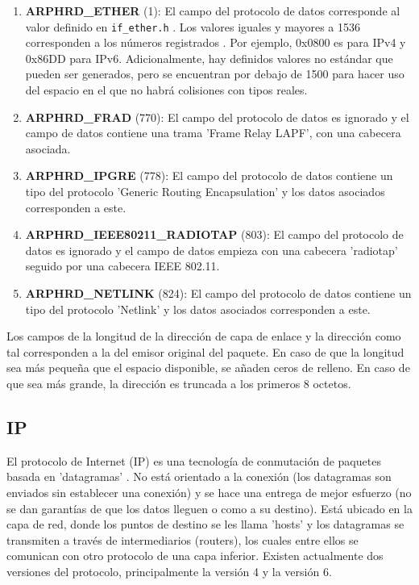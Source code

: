 \begin{enumerate}
    \item \textbf{ARPHRD\_ETHER} (1): El campo del protocolo de datos corresponde al valor definido en \texttt{if\_ether.h} \cite{linuxifether}. Los valores iguales y mayores a 1536 corresponden a los números registrados \cite{etherprotocolnumbers}. Por ejemplo, 0x0800 es para IPv4 y 0x86DD para IPv6. Adicionalmente, hay definidos valores no estándar que pueden ser generados, pero se encuentran por debajo de 1500 para hacer uso del espacio en el que no habrá colisiones con tipos reales.
    \item \textbf{ARPHRD\_FRAD} (770): El campo del protocolo de datos es ignorado y el campo de datos contiene una trama 'Frame Relay LAPF', con una cabecera asociada. 
    \item \textbf{ARPHRD\_IPGRE} (778): El campo del protocolo de datos contiene un tipo del protocolo 'Generic Routing Encapsulation' y los datos asociados corresponden a este.
    \item \textbf{ARPHRD\_IEEE80211\_RADIOTAP} (803): El campo del protocolo de datos es ignorado y el campo de datos empieza con una cabecera 'radiotap' seguido por una cabecera IEEE 802.11.
    \item \textbf{ARPHRD\_NETLINK} (824): El campo del protocolo de datos contiene un tipo del protocolo 'Netlink' y los datos asociados corresponden a este.
\end{enumerate}

Los campos de la longitud de la dirección de capa de enlace y la dirección como tal corresponden a la del emisor original del paquete. En caso de que la longitud sea más pequeña que el espacio disponible, se añaden ceros de relleno. En caso de que sea más grande, la dirección es truncada a los primeros 8 octetos.

\subsection{IP}

El protocolo de Internet (IP) es una tecnología de conmutación de paquetes basada en 'datagramas' \cite{iptechslides}. No está orientado a la conexión (los datagramas son enviados sin establecer una conexión) y se hace una entrega de mejor esfuerzo (no se dan garantías de que los datos lleguen o como a su destino). Está ubicado en la capa de red, donde los puntos de destino se les llama 'hosts' y los datagramas se transmiten a través de intermediarios (routers), los cuales entre ellos se comunican con otro protocolo de una capa inferior. Existen actualmente dos versiones del protocolo, principalmente la versión 4 y la versión 6.

